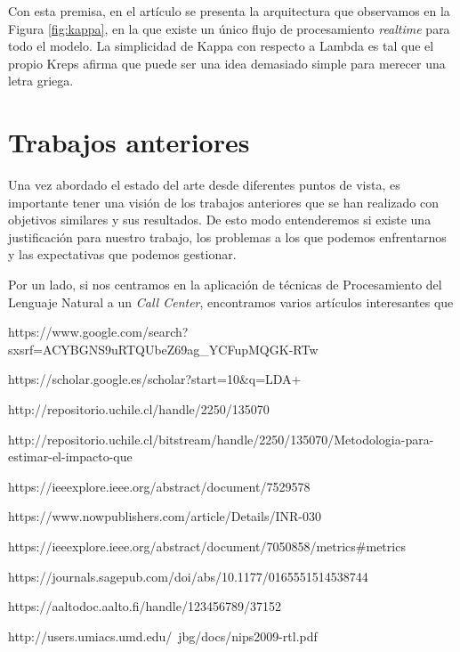 Con esta premisa, en el artículo se presenta la arquitectura que observamos en la Figura \ref{fig:kappa}, en la que existe un único flujo de procesamiento \textit{realtime} para todo el modelo. La simplicidad de Kappa con respecto a Lambda es tal que el propio Kreps afirma que puede ser una idea demasiado simple para merecer una letra griega.



\section{Trabajos anteriores}

Una vez abordado el estado del arte desde diferentes puntos de vista, es importante tener una visión de los trabajos anteriores que se han realizado con objetivos similares y sus resultados. De esto modo entenderemos si existe una justificación para nuestro trabajo, los problemas a los que podemos enfrentarnos y las expectativas que podemos gestionar.

Por un lado, si nos centramos en la aplicación de técnicas de Procesamiento del Lenguaje Natural a un \textit{Call Center}, encontramos varios artículos interesantes que 


https://www.google.com/search?sxsrf=ACYBGNS9uRTQUbeZ69ag_YCFupMQGK-RTw%

https://scholar.google.es/scholar?start=10&q=LDA+%


http://repositorio.uchile.cl/handle/2250/135070

http://repositorio.uchile.cl/bitstream/handle/2250/135070/Metodologia-para-estimar-el-impacto-que%

https://ieeexplore.ieee.org/abstract/document/7529578

https://www.nowpublishers.com/article/Details/INR-030

https://ieeexplore.ieee.org/abstract/document/7050858/metrics#metrics

https://journals.sagepub.com/doi/abs/10.1177/0165551514538744

https://aaltodoc.aalto.fi/handle/123456789/37152

http://users.umiacs.umd.edu/~jbg/docs/nips2009-rtl.pdf 
